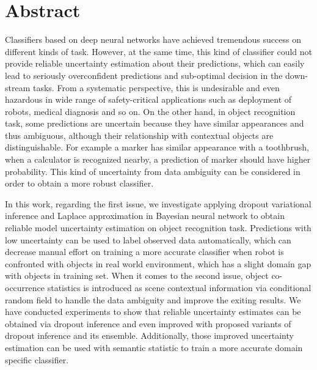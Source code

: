 
\thispagestyle{plain}

\section*{Abstract}

Classifiers based on deep neural networks have achieved tremendous success on different kinds of task. However, at the same time, this kind of classifier could not provide reliable uncertainty estimation about their predictions, which can easily lead to seriously overconfident predictions and sub-optimal decision in the down-stream tasks. From a systematic perspective, this is undesirable and even hazardous in wide range of safety-critical applications such as deployment of robots, medical diagnosis and so on. On the other hand, in object recognition task, some predictions are uncertain because they have similar appearances and thus ambiguous, although their relationship with contextual objects are distinguishable. For example a marker has similar appearance with a toothbrush, when a calculator is recognized nearby, a prediction of marker should have higher probability. This kind of uncertainty from data ambiguity can be considered in order to obtain a more robust classifier.

In this work, regarding the first issue, we investigate applying dropout variational inference and Laplace approximation in Bayesian neural network to obtain reliable model uncertainty estimation on object recognition task. Predictions with low uncertainty can be used to label observed data automatically, which can decrease manual effort on training a more accurate classifier when robot is confronted with objects in real world environment, which has a slight domain gap with objects in training set. When it comes to the second issue, object co-occurrence statistics is introduced as scene contextual information via conditional random field to handle the data ambiguity and improve the exiting results. We have conducted experiments to show that reliable uncertainty estimates can be obtained via dropout inference and even improved with proposed variants of dropout inference and its ensemble. Additionally, those improved uncertainty estimation can be used with semantic statistic to train a more accurate domain specific classifier.

\switchlanguage{\lang} %
